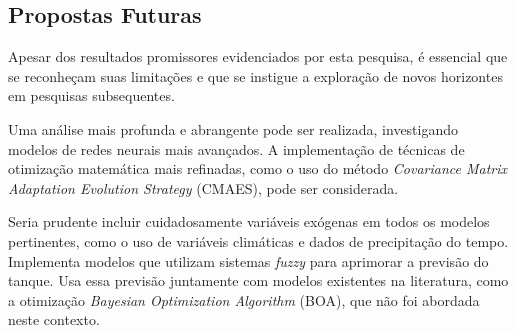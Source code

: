 \newpage
\subsection{Propostas Futuras}

Apesar dos resultados promissores evidenciados por esta pesquisa, é essencial que se reconheçam suas limitações e que se instigue a exploração de novos horizontes em pesquisas subsequentes.

Uma análise mais profunda e abrangente pode ser realizada, investigando modelos de redes neurais mais avançados. A implementação de técnicas de otimização matemática mais refinadas, como o uso do método \textit{Covariance Matrix Adaptation Evolution Strategy} (CMAES), pode ser considerada. 

Seria prudente incluir cuidadosamente variáveis exógenas em todos os modelos pertinentes, como o uso de variáveis climáticas e dados de precipitação do tempo.
Implementa modelos que utilizam sistemas \textit{fuzzy} para aprimorar a previsão do tanque. Usa essa previsão juntamente com modelos existentes na literatura, como a otimização \textit{Bayesian Optimization Algorithm} (BOA), que não foi abordada neste contexto.


